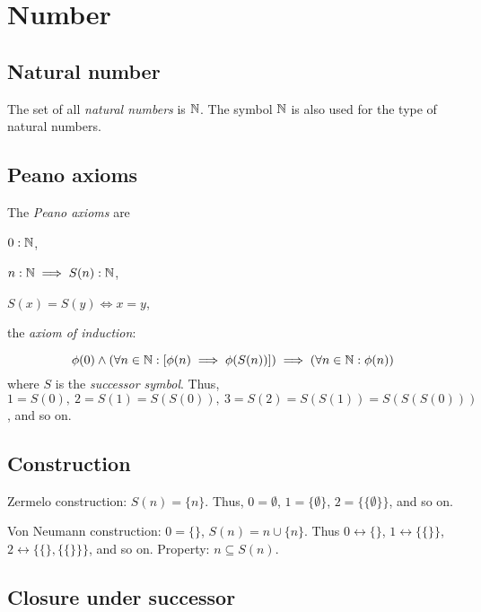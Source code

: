 \chapter{Number}

\section{Natural number}

%
The set of all \emph{natural numbers} is \(\mathbb{N}\).
The symbol \(\mathbb{N}\) is also used for the type of natural numbers.

\section{Peano axioms}

%
The \emph{Peano axioms} are
\begin{enumerate*}[label={(\arabic*)}]
    \item \(0 : \mathbb{N}\),
    \item \(n : \mathbb{N} \implies S(n) : \mathbb{N}\),
    \item \(S(x) = S(y) \iff x = y\),
    \item the
%
%
\emph{axiom of induction}:
\end{enumerate*}
\[
    \phi(0) \wedge (\forall n \in \mathbb{N} : [\phi(n) \implies \phi(S(n))]) \implies (\forall n \in \mathbb{N} : \phi(n))
\]
%
where \(S\) is the \emph{successor symbol}.
Thus, \(1 = S(0), ~ 2 = S(1) = S(S(0)), ~ 3 = S(2) = S(S(1)) = S(S(S(0)))\), and so on.

\section{Construction}

%
%
Zermelo construction:
\(S(n) = \{n\}\).
Thus, \(0 = \emptyset\), \(1 = \{\emptyset\}\), \(2 = \{\{\emptyset\}\}\), and so on.

%
%
Von Neumann construction:
\(0 = \{\}\),
\(S(n) = n \cup \{n\}\).
Thus \(0 \leftrightarrow \{\}\), \(1 \leftrightarrow \{\{\}\}\), \(2 \leftrightarrow \{\{\}, \{\{\}\}\}\), and so on.
Property: \(n \subseteq S(n)\).

\section{Closure under successor}

